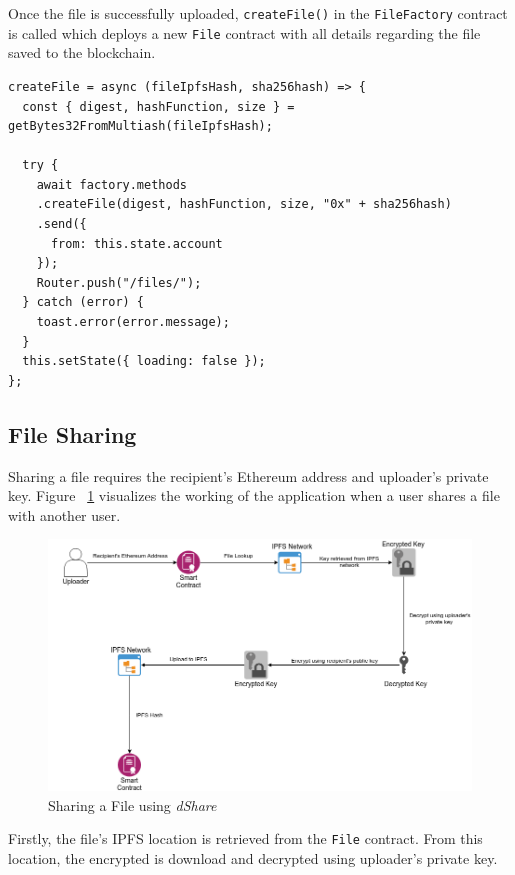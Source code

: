 \documentclass[]{article}
\begin{document}
		Once the file is successfully uploaded, \texttt{createFile()} in the \texttt{FileFactory} contract is called which deploys a new \texttt{File} contract with all details regarding the file saved to the blockchain.
		
\begin{verbatim}
createFile = async (fileIpfsHash, sha256hash) => {
  const { digest, hashFunction, size } = getBytes32FromMultiash(fileIpfsHash);

  try {
    await factory.methods
    .createFile(digest, hashFunction, size, "0x" + sha256hash)
    .send({
      from: this.state.account
    });
    Router.push("/files/");
  } catch (error) {
    toast.error(error.message);
  }
  this.setState({ loading: false });
};
\end{verbatim}
		
		\newpage
		\subsection{File Sharing}
		Sharing a file requires the recipient's Ethereum address and uploader's private key. Figure ~\ref{fig:share} visualizes the working of the application when a user shares a file with another user.
		
		\begin{figure}[h]
			\includegraphics[width=\linewidth]{share.png}
			\caption{Sharing a File using \textit{dShare}}
			\label{fig:share}
		\end{figure}
	
		Firstly, the file's IPFS location is retrieved from the \texttt{File} contract. From this location, the encrypted is download and decrypted using uploader's private key.
		
\end{document}
